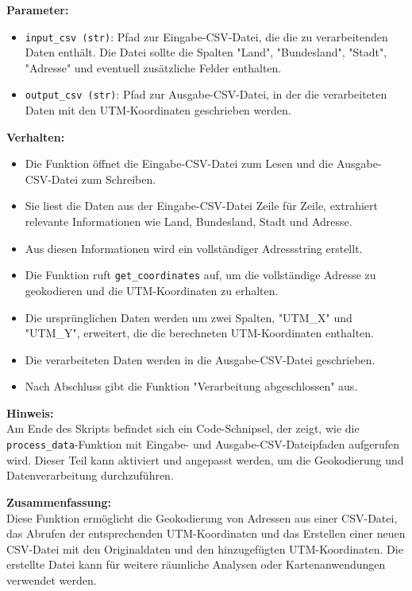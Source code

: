 \textbf{Parameter:}
\begin{itemize}
    \item \texttt{input\_csv (str)}: Pfad zur Eingabe-CSV-Datei, die die zu verarbeitenden Daten enthält. Die Datei sollte die Spalten "Land", "Bundesland", "Stadt", "Adresse" und eventuell zusätzliche Felder enthalten.
    \item \texttt{output\_csv (str)}: Pfad zur Ausgabe-CSV-Datei, in der die verarbeiteten Daten mit den UTM-Koordinaten geschrieben werden.
\end{itemize}

\textbf{Verhalten:}
\begin{itemize}
    \item Die Funktion öffnet die Eingabe-CSV-Datei zum Lesen und die Ausgabe-CSV-Datei zum Schreiben.
    \item Sie liest die Daten aus der Eingabe-CSV-Datei Zeile für Zeile, extrahiert relevante Informationen wie Land, Bundesland, Stadt und Adresse.
    \item Aus diesen Informationen wird ein vollständiger Adressstring erstellt.
    \item Die Funktion ruft \texttt{get\_coordinates} auf, um die vollständige Adresse zu geokodieren und die UTM-Koordinaten zu erhalten.
    \item Die ursprünglichen Daten werden um zwei Spalten, "UTM\_X" und "UTM\_Y", erweitert, die die berechneten UTM-Koordinaten enthalten.
    \item Die verarbeiteten Daten werden in die Ausgabe-CSV-Datei geschrieben.
    \item Nach Abschluss gibt die Funktion "Verarbeitung abgeschlossen" aus.
\end{itemize}

\textbf{Hinweis:}\\
Am Ende des Skripts befindet sich ein Code-Schnipsel, der zeigt, wie die \texttt{process\_data}-Funktion mit Eingabe- und Ausgabe-CSV-Dateipfaden aufgerufen wird. Dieser Teil kann aktiviert und angepasst werden, um die Geokodierung und Datenverarbeitung durchzuführen.

\textbf{Zusammenfassung:}\\
Diese Funktion ermöglicht die Geokodierung von Adressen aus einer CSV-Datei, das Abrufen der entsprechenden UTM-Koordinaten und das Erstellen einer neuen CSV-Datei mit den Originaldaten und den hinzugefügten UTM-Koordinaten. Die erstellte Datei kann für weitere räumliche Analysen oder Kartenanwendungen verwendet werden.
